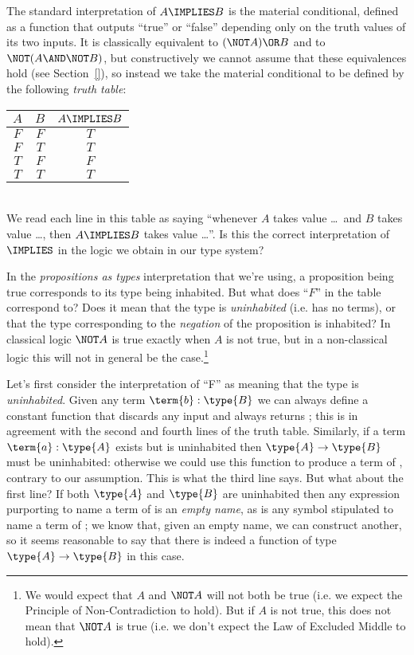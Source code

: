 The standard interpretation of $A \IMPLIES B$ is the material conditional, defined as a function that outputs ``true'' or ``false'' depending only on the truth values of its two inputs.  It is classically equivalent to $(\NOT A) \OR B$ and to $\NOT (A \AND \NOT B)$, but constructively we cannot assume that these equivalences hold (see Section~\ref{}), so instead we take the material conditional to be defined by the following \emph{truth table}:
\begin{table}[h]
\centering
\begin{tabular}{c|c|c}
$A$ & $B$ & $A \IMPLIES B$ \\
\hline
$F$ & $F$ & $T$ \\
$F$ & $T$ & $T$ \\
$T$ & $F$ & $F$ \\
$T$ & $T$ & $T$
\end{tabular}
\end{table}\\
We read each line in this table as saying ``whenever $A$ takes value \ldots\ and $B$ takes value \ldots, then $A \IMPLIES B$ takes value \ldots''.  Is this the correct interpretation of $\IMPLIES$ in the logic we obtain in our type system?

In the \emph{propositions as types} interpretation that we're using, a proposition being true corresponds to its type being inhabited.  But what does ``$F$'' in the table correspond to?  Does it mean that the type is \emph{uninhabited} (i.e. has no terms), or that the type corresponding to the \emph{negation} of the proposition is inhabited?
In classical logic $\NOT A$ is true exactly when $A$ is not true, but in a non-classical logic this will not in general be the case.\footnote{
We would expect that $A$ and $\NOT A$ will not both be true (i.e. we expect the Principle of Non-Contradiction to hold).  But if $A$ is not true, this does not mean that $\NOT A$ is true (i.e. we don't expect the Law of Excluded Middle to hold).
}

Let's first consider the interpretation of ``F'' as meaning that the type is \emph{uninhabited}.
Given any term $\term{b}:\type{B}$ we can always define a constant function that discards any input and always returns ; this is in agreement with the second and fourth lines of the truth table.  Similarly, if a term $\term{a}:\type{A}$ exists but  is uninhabited then 
$\type{A} \to \type{B}$ must be uninhabited: otherwise we could use this function to produce a term of , contrary to our assumption.  This is what the third line says.  But what about the first line?  If both $\type{A}$ and $\type{B}$ are uninhabited then any expression purporting to name a term of  is an \emph{empty name}, as is any symbol stipulated to name a term of ; we know that, given an empty name, we can construct another, so it seems reasonable to say that there is indeed a function of type $\type{A} \to \type{B}$ in this case.


